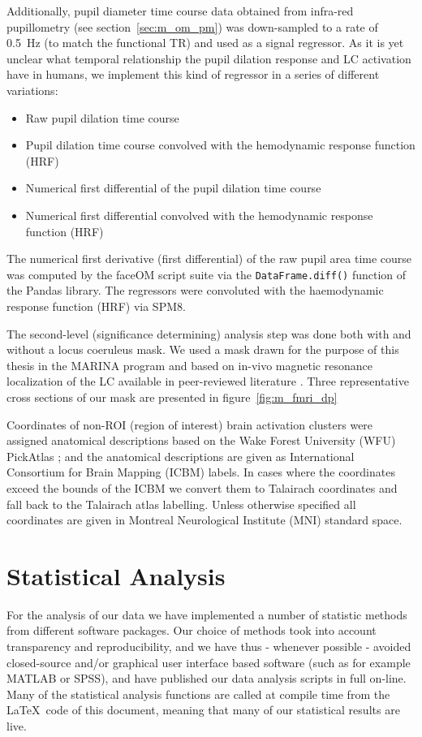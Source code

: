 	    Additionally, pupil diameter time course data obtained from infra-red pupillometry (see section~\ref{sec:m_om_pm}) was down-sampled to a rate of \SI{0.5}{\hertz} (to match the functional TR) and used as a signal regressor.
	    As it is yet unclear what temporal relationship the pupil dilation response and LC activation have in humans, we implement this kind of regressor in a series of different variations:
	    \begin{itemize}
		\item Raw pupil dilation time course
		\item Pupil dilation time course convolved with the hemodynamic response function (HRF)
		\item Numerical first differential of the pupil dilation time course
		\item Numerical first differential convolved with the hemodynamic response function (HRF)
	    \end{itemize}
	    
	    The numerical first derivative (first differential) of the raw pupil area time course was computed by the faceOM script suite via the \colorbox{vlg}{\texttt{DataFrame.diff()}} function of the Pandas \citep{pandas} library.
	    The regressors were convoluted with the haemodynamic response function (HRF) via SPM8.
	    
	    The second-level (significance determining) analysis step was done both with and without a locus coeruleus mask.
	    We used a mask drawn for the purpose of this thesis in the MARINA program \citep{Walter2003} and based on in-vivo magnetic resonance localization of the LC available in peer-reviewed literature \citep{Keren2009}.
	    Three representative cross sections of our mask are presented in figure~\ref{fig:m_fmri_dp}
		
	    Coordinates of non-ROI (region of interest) brain activation clusters were assigned anatomical descriptions based on the Wake Forest University (WFU) PickAtlas \citep{Maldjian2003}; 
	    and the anatomical descriptions are given as International Consortium for Brain Mapping (ICBM) labels.
	    In cases where the coordinates exceed the bounds of the ICBM we convert them to Talairach coordinates and fall back to the Talairach atlas labelling.
	    Unless otherwise specified all coordinates are given in Montreal Neurological Institute (MNI) standard space.
	    
    \section{Statistical Analysis}\label{sec:m_sa}
	For the analysis of our data we have implemented a number of statistic methods from different software packages.
	Our choice of methods took into account transparency and reproducibility, and we have thus - whenever possible - avoided closed-source and/or graphical user interface based software (such as for example MATLAB\textsuperscript{\small\textregistered} or SPSS\textsuperscript{\small\textregistered}), and have published our data analysis scripts in full on-line.
	Many of the statistical analysis functions are called at compile time from the \LaTeX\ code of this document, meaning that many of our statistical results are live.
	
